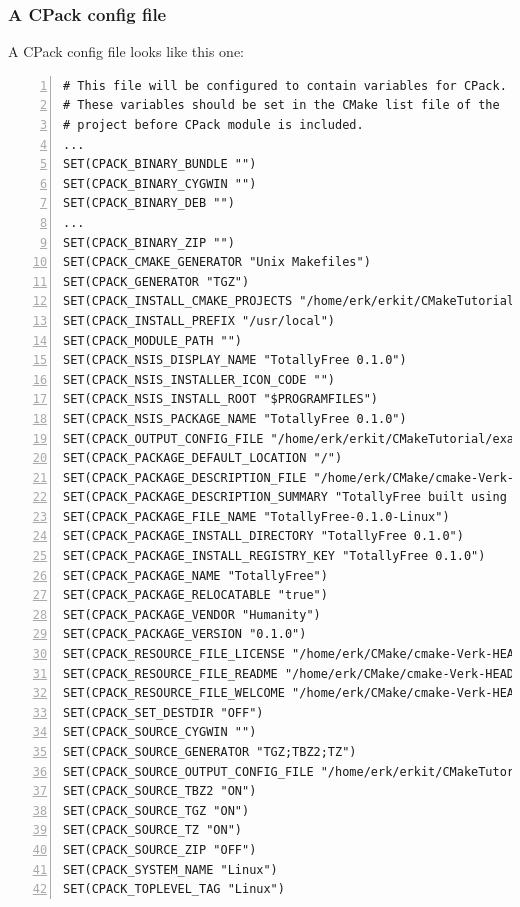 \documentclass[compress,slidestop,table,usepdftitle=false
              ]
               {beamer}
\begin{document}
\begin{frame}
\frametitle{A CPack config file}
A CPack config file looks like this one:
\begin{lstlisting}[basicstyle=\scriptsize,numbers=left,breaklines=true]
# This file will be configured to contain variables for CPack.
# These variables should be set in the CMake list file of the
# project before CPack module is included.
...
SET(CPACK_BINARY_BUNDLE "")
SET(CPACK_BINARY_CYGWIN "")
SET(CPACK_BINARY_DEB "")
...
SET(CPACK_BINARY_ZIP "")
SET(CPACK_CMAKE_GENERATOR "Unix Makefiles")
SET(CPACK_GENERATOR "TGZ")
SET(CPACK_INSTALL_CMAKE_PROJECTS "/home/erk/erkit/CMakeTutorial/examples/build;TotallyFree;ALL;/")
SET(CPACK_INSTALL_PREFIX "/usr/local")
SET(CPACK_MODULE_PATH "")
SET(CPACK_NSIS_DISPLAY_NAME "TotallyFree 0.1.0")
SET(CPACK_NSIS_INSTALLER_ICON_CODE "")
SET(CPACK_NSIS_INSTALL_ROOT "$PROGRAMFILES")
SET(CPACK_NSIS_PACKAGE_NAME "TotallyFree 0.1.0")
SET(CPACK_OUTPUT_CONFIG_FILE "/home/erk/erkit/CMakeTutorial/examples/build/CPackConfig.cmake")
SET(CPACK_PACKAGE_DEFAULT_LOCATION "/")
SET(CPACK_PACKAGE_DESCRIPTION_FILE "/home/erk/CMake/cmake-Verk-HEAD/share/cmake-2.8/Templates/CPack.GenericDescription.txt")
SET(CPACK_PACKAGE_DESCRIPTION_SUMMARY "TotallyFree built using CMake")
SET(CPACK_PACKAGE_FILE_NAME "TotallyFree-0.1.0-Linux")
SET(CPACK_PACKAGE_INSTALL_DIRECTORY "TotallyFree 0.1.0")
SET(CPACK_PACKAGE_INSTALL_REGISTRY_KEY "TotallyFree 0.1.0")
SET(CPACK_PACKAGE_NAME "TotallyFree")
SET(CPACK_PACKAGE_RELOCATABLE "true")
SET(CPACK_PACKAGE_VENDOR "Humanity")
SET(CPACK_PACKAGE_VERSION "0.1.0")
SET(CPACK_RESOURCE_FILE_LICENSE "/home/erk/CMake/cmake-Verk-HEAD/share/cmake-2.8/Templates/CPack.GenericLicense.txt")
SET(CPACK_RESOURCE_FILE_README "/home/erk/CMake/cmake-Verk-HEAD/share/cmake-2.8/Templates/CPack.GenericDescription.txt")
SET(CPACK_RESOURCE_FILE_WELCOME "/home/erk/CMake/cmake-Verk-HEAD/share/cmake-2.8/Templates/CPack.GenericWelcome.txt")
SET(CPACK_SET_DESTDIR "OFF")
SET(CPACK_SOURCE_CYGWIN "")
SET(CPACK_SOURCE_GENERATOR "TGZ;TBZ2;TZ")
SET(CPACK_SOURCE_OUTPUT_CONFIG_FILE "/home/erk/erkit/CMakeTutorial/examples/build/CPackSourceConfig.cmake")
SET(CPACK_SOURCE_TBZ2 "ON")
SET(CPACK_SOURCE_TGZ "ON")
SET(CPACK_SOURCE_TZ "ON")
SET(CPACK_SOURCE_ZIP "OFF")
SET(CPACK_SYSTEM_NAME "Linux")
SET(CPACK_TOPLEVEL_TAG "Linux")
\end{lstlisting}
\end{frame}
\end{document}
